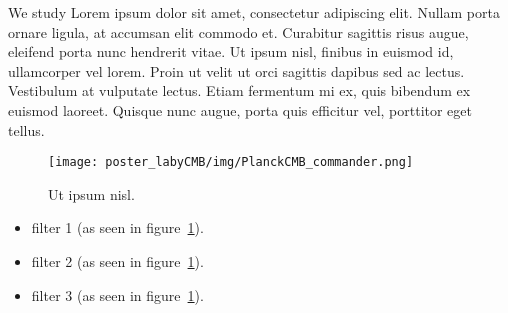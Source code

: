 We study Lorem ipsum dolor sit amet, consectetur adipiscing elit. Nullam porta ornare ligula, at accumsan elit commodo et. Curabitur sagittis risus augue, eleifend porta nunc hendrerit vitae. Ut ipsum nisl, finibus in euismod id, ullamcorper vel lorem. Proin ut velit ut orci sagittis dapibus sed ac lectus. Vestibulum at vulputate lectus. Etiam fermentum mi ex, quis bibendum ex euismod laoreet. Quisque nunc augue, porta quis efficitur vel, porttitor eget tellus.

\vspace{0.5em}
\begin{figure}
	\begin{minipage}{0.94\textwidth}
		\centering\texttt{[image: poster\_labyCMB/img/PlanckCMB\_commander.png]}
		\caption{Ut ipsum nisl.}
		\label{fig:stim}
	\end{minipage}
\end{figure}

\begin{itemize}

	\item filter 1 (as seen in figure~\ref{fig:stim}).
	
 	\item filter 2 (as seen in figure~\ref{fig:stim}).
 	
 	\item filter 3 (as seen in figure~\ref{fig:stim}).
 	
\end{itemize}
